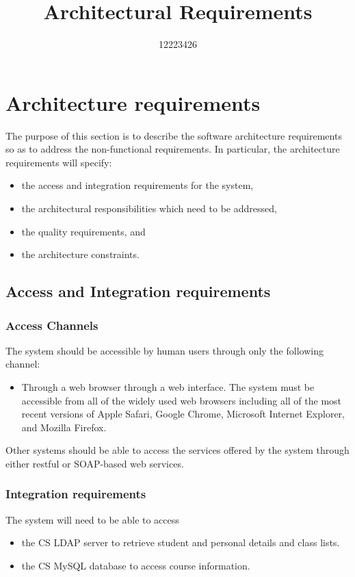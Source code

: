 \documentclass[11pt,a4paper]{article}
\begin{document}
\begin{titlepage}
\title{Architectural Requirements}
\author{12223426}
\maketitle
\end{titlepage}

\section{Architecture requirements}
The purpose of this section is to describe the software architecture requirements so as to address the non-functional requirements. In particular, the architecture requirements will specify:
\begin{itemize}
	\item the access and integration requirements for the system,
	\item the architectural responsibilities which need to be addressed,
	\item the quality requirements, and
	\item the architecture constraints.
\end{itemize}

	\subsection{Access and Integration requirements}
		\subsubsection{Access Channels}
		The system should be accessible by human users through only the following channel:
		\begin{itemize}
			\item Through a web browser through a web interface. The system must be accessible from all of the widely used web browsers including all of the most recent versions of Apple Safari, Google Chrome, Microsoft Internet Explorer, and Mozilla Firefox.
		\end{itemize}

Other systems should be able to access the services offered by the system through either restful or SOAP-based web services.
		\subsubsection{Integration requirements}
		The system will need to be able to access
		\begin{itemize}
			\item the CS LDAP server to retrieve student and personal details and class lists.
			\item the CS MySQL database to access course information.
		\end{itemize}
\end{document}
